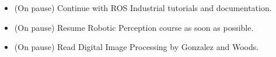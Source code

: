 \documentclass[11pt]{article}
\begin{document}
\begin{itemize}

	\item (On pause) Continue with ROS Industrial tutorials and documentation.

	\item (On pause) Resume Robotic Perception course as soon as possible.

	\item (On pause) Read Digital Image Processing by Gonzalez and Woods.

\end{itemize}



\newpage


\end{document}

